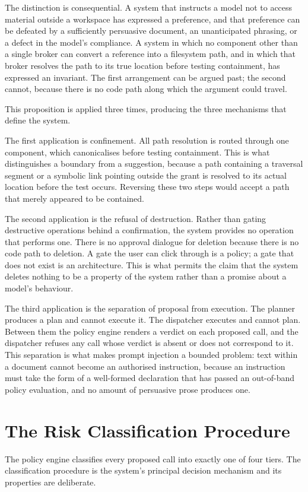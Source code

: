 \documentclass{FastFyp}
\begin{document}
The distinction is consequential. A system that instructs a model not to access material outside a workspace has expressed a preference, and that preference can be defeated by a sufficiently persuasive document, an unanticipated phrasing, or a defect in the model's compliance. A system in which no component other than a single broker can convert a reference into a filesystem path, and in which that broker resolves the path to its true location before testing containment, has expressed an invariant. The first arrangement can be argued past; the second cannot, because there is no code path along which the argument could travel.

This proposition is applied three times, producing the three mechanisms that define the system.

The first application is confinement. All path resolution is routed through one component, which canonicalises before testing containment. This is what distinguishes a boundary from a suggestion, because a path containing a traversal segment or a symbolic link pointing outside the grant is resolved to its actual location before the test occurs. Reversing these two steps would accept a path that merely appeared to be contained.

The second application is the refusal of destruction. Rather than gating destructive operations behind a confirmation, the system provides no operation that performs one. There is no approval dialogue for deletion because there is no code path to deletion. A gate the user can click through is a policy; a gate that does not exist is an architecture. This is what permits the claim that the system deletes nothing to be a property of the system rather than a promise about a model's behaviour.

The third application is the separation of proposal from execution. The planner produces a plan and cannot execute it. The dispatcher executes and cannot plan. Between them the policy engine renders a verdict on each proposed call, and the dispatcher refuses any call whose verdict is absent or does not correspond to it. This separation is what makes prompt injection a bounded problem: text within a document cannot become an authorised instruction, because an instruction must take the form of a well-formed declaration that has passed an out-of-band policy evaluation, and no amount of persuasive prose produces one.

\section{The Risk Classification Procedure}
The policy engine classifies every proposed call into exactly one of four tiers. The classification procedure is the system's principal decision mechanism and its properties are deliberate.
\end{document}
